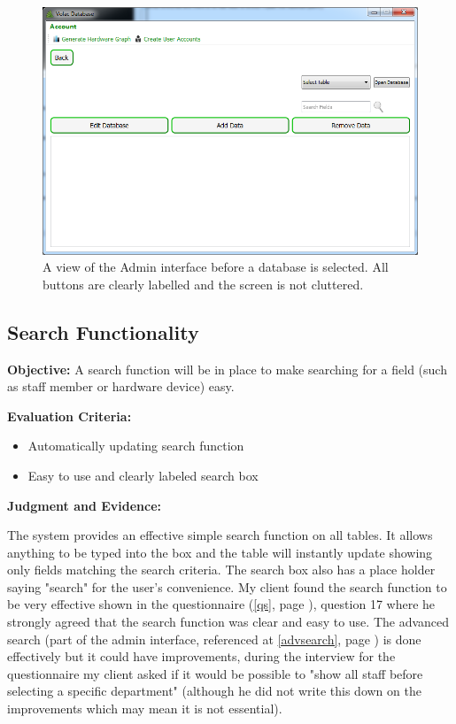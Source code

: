 \begin{figure}[H]
    \includegraphics[width=\textwidth]{./Evaluation/Images/clearlabels.png}
    \caption{A view of the Admin interface before a database is selected. All buttons are clearly labelled and the screen is not cluttered.} 
\end{figure}

\subsection{Search Functionality}\label{searchf}

\textbf{Objective:} A search function will be in place to make searching for a field (such as staff member or hardware device) easy.

\textbf{Evaluation Criteria:}
\begin{itemize}
\item{Automatically updating search function}
\item{Easy to use and clearly labeled search box}
\end{itemize}

\textbf{Judgment and Evidence:}

The system provides an effective simple search function on all tables. It allows anything to be typed into the box and the table will instantly update showing only fields matching the search criteria. The search box also has a place holder saying "search" for the user's convenience. My client found the search function to be very effective shown in the questionnaire (\ref{qs}, page \pageref{qs}), question 17 where he strongly agreed that the search function was clear and easy to use. The advanced search (part of the admin interface, referenced at \ref{advsearch}, page \pageref{advsearch}) is done effectively but it could have improvements, during the interview for the questionnaire my client asked if it would be possible to "show all staff before selecting a specific department" (although he did not write this down on the improvements which may mean it is not essential).

